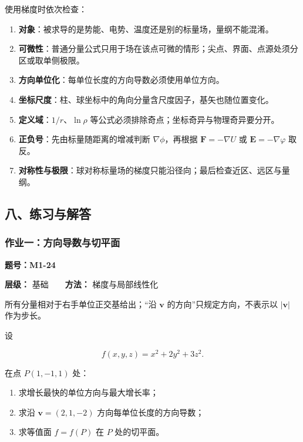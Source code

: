 使用梯度时依次检查：

\begin{enumerate}
\def\labelenumi{\arabic{enumi}.}
\tightlist
\item
  \textbf{对象}：被求导的是势能、电势、温度还是别的标量场，量纲不能混淆。
\item
  \textbf{可微性}：普通分量公式只用于场在该点可微的情形；尖点、界面、点源处须分区或取单侧极限。
\item
  \textbf{方向单位化}：每单位长度的方向导数必须使用单位方向。
\item
  \textbf{坐标尺度}：柱、球坐标中的角向分量含尺度因子，基矢也随位置变化。
\item
  \textbf{定义域}：\(1/r\)、\(\ln\rho\)
  等公式必须排除奇点；坐标奇异与物理奇异要分开。
\item
  \textbf{正负号}：先由标量随距离的增减判断 \(\nabla\phi\)，再根据
  \(\mathbf F=-\nabla U\) 或 \(\mathbf E=-\nabla\varphi\) 取反。
\item
  \textbf{对称性与极限}：球对称标量场的梯度只能沿径向；最后检查近区、远区与量纲。
\end{enumerate}

\subsection{八、练习与解答}\label{m1:ux516bux7ec3ux4e60ux4e0eux89e3ux7b54}

\par{}
\noindent\begin{minipage}{\linewidth}

\subsubsection{作业一：方向导数与切平面}\label{m1:ux4f5cux4e1aux4e00ux65b9ux5411ux5bfcux6570ux4e0eux5207ux5e73ux9762}

\textbf{题号：M1-24}

\textbf{层级：} 基础　　\textbf{方法：} 梯度与局部线性化

所有分量相对于右手单位正交基给出；``沿 \(\mathbf v\)
的方向''只规定方向，不表示以 \(|\mathbf v|\) 作为步长。

设

\[
f(x,y,z)=x^2+2y^2+3z^2.
\]

在点 \(P(1,-1,1)\) 处：

\begin{enumerate}
\def\labelenumi{\arabic{enumi}.}
\tightlist
\item
  求增长最快的单位方向与最大增长率；
\item
  求沿 \(\mathbf v=(2,1,-2)\) 方向每单位长度的方向导数；
\item
  求等值面 \(f=f(P)\) 在 \(P\) 处的切平面。
\end{enumerate}


\end{minipage}\par

